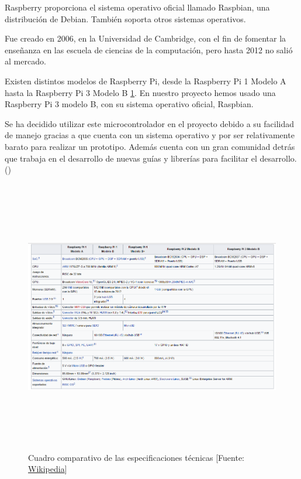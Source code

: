 Raspberry proporciona el sistema operativo oficial llamado Raspbian, una distribución de Debian. También soporta otros sistemas operativos.
 
Fue creado en 2006, en la Universidad de Cambridge, con el fin de fomentar la enseñanza en las escuela de ciencias de la computación, pero hasta 2012 no salió al mercado.

Existen distintos modelos de Raspberry Pi, desde la Raspberry Pi 1 Modelo A hasta la Raspberry Pi 3 Modelo B \ref{types}.
En nuestro proyecto hemos usado una Raspberry Pi 3 modelo B, con su sistema operativo oficial, Raspbian.

Se ha decidido utilizar este microcontrolador en el proyecto debido a su facilidad de manejo gracias a que cuenta con un sistema operativo y por ser relativamente barato para realizar un prototipo. Además cuenta con un gran comunidad detrás que trabaja en el desarrollo de nuevas guías y librerías para facilitar el desarrollo. (\cite{ARP:RaspberryPi:2017})

\begin{figure}[htb]
	\begin{center}
		\includegraphics[width=17cm,height=12cm]{figures/Cuadro_Tipos_Raspberry.png}
		\caption{Cuadro comparativo de las especificaciones técnicas [Fuente: \href{www.wikipedia.org}{Wikipedia}]}
	\end{center}

	\label{types}
\end{figure}

